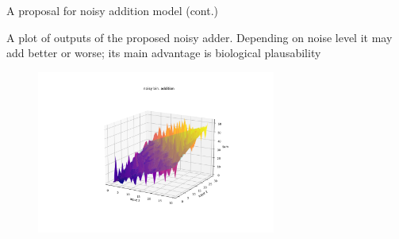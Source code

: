 \documentclass[10pt, aspectratio=169, handout]{beamer}
\begin{document}
    

\begin{frame}{A proposal for noisy addition model (cont.)}
   
    A plot of outputs of the proposed noisy adder. Depending on noise level it may add better or worse; its main advantage is biological plausability
        
        \begin{figure}[h!]
            \centering
            \includegraphics[width=0.7\textwidth]{images/anoisy_adding.png}
            \caption{}
            \label{fig:noisy_adder}
        \end{figure}
    
    
    
    \end{frame}
    
\end{document}
